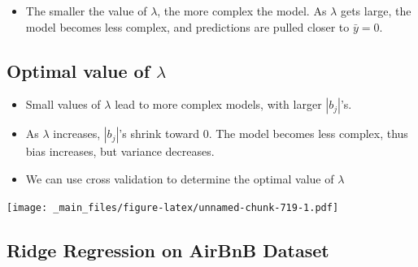\documentclass[]{book}
\newenvironment{Shaded}{\begin{snugshade}}{\end{snugshade}}
\newcommand{\KeywordTok}[1]{\textcolor[rgb]{0.13,0.29,0.53}{\textbf{#1}}}
\newcommand{\StringTok}[1]{\textcolor[rgb]{0.31,0.60,0.02}{#1}}
\newcommand{\OperatorTok}[1]{\textcolor[rgb]{0.81,0.36,0.00}{\textbf{#1}}}
\newcommand{\NormalTok}[1]{#1}
\providecommand{\tightlist}{%
  \setlength{\itemsep}{0pt}\setlength{\parskip}{0pt}}
\begin{document}
\begin{itemize}
\tightlist
\item
  The smaller the value of \(\lambda\), the more complex the model. As
  \(\lambda\) gets large, the model becomes less complex, and
  predictions are pulled closer to \(\bar{y}=0\).
\end{itemize}

\subsection{\texorpdfstring{Optimal value of
\(\lambda\)}{Optimal value of \textbackslash{}lambda}}\label{optimal-value-of-lambda}

\begin{itemize}
\tightlist
\item
  Small values of \(\lambda\) lead to more complex models, with larger
  \(|b_j|\)'s.\\
\item
  As \(\lambda\) increases, \(|b_j|\)'s shrink toward 0. The model
  becomes less complex, thus bias increases, but variance decreases.\\
\item
  We can use cross validation to determine the optimal value of
  \(\lambda\)
\end{itemize}

\texttt{[image: \_main\_files/figure-latex/unnamed-chunk-719-1.pdf]}

\subsection{Ridge Regression on AirBnB
Dataset}\label{ridge-regression-on-airbnb-dataset}

\begin{Shaded}
\end{Shaded}
\end{document}
